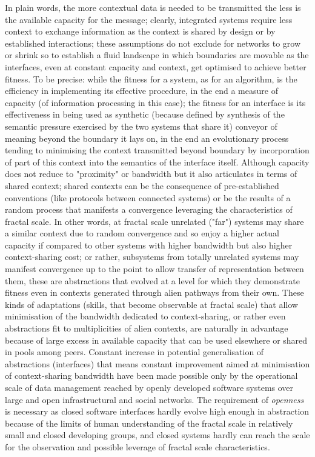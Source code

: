 \documentclass[14pt]{extarticle}
\begin{document}
In plain words, the more contextual data is needed to be transmitted the less is the available capacity for the message; clearly, integrated systems require less context to exchange information as the context is shared by design or by established interactions; these assumptions do not exclude for networks to grow or shrink so to establish a fluid landscape in which boundaries are movable as the interfaces, even at constant capacity and context, get optimised to achieve better fitness. To be precise: while the fitness for a system, as for an algorithm, is the efficiency in implementing its effective procedure, in the end a measure of capacity (of information processing in this case); the fitness for an interface is its effectiveness in being used as synthetic (because defined by synthesis of the semantic pressure exercised by the two systems that share it) conveyor of meaning beyond the boundary it lays on, in the end an evolutionary process tending to minimising the context transmitted beyond boundary by incorporation of part of this context into the semantics of the interface itself.
\newline
Although capacity does not reduce to "proximity" or bandwidth but it also articulates in terms of shared context; shared contexts can be the consequence of pre-established conventions (like protocols between connected systems) or be the results of a random process that manifests a convergence leveraging the characteristics of fractal scale. In other words, at fractal scale unrelated ("far") systems may share a similar context due to random convergence and so enjoy a higher actual capacity if compared to other systems with higher bandwidth but also higher context-sharing cost; or rather, subsystems from totally unrelated systems may manifest convergence up to the point to allow transfer of representation between them, these are abstractions that evolved at a level for which they demonstrate fitness even in contexts generated through alien pathways from their own. These kinds of adaptations (skills, that become observable at fractal scale) that allow minimisation of the bandwidth dedicated to context-sharing, or rather even abstractions fit to multiplicities of alien contexts, are naturally in advantage because of large excess in available capacity that can be used elsewhere or shared in pools among peers. Constant increase in potential generalisation of abstractions (interfaces) that means constant improvement aimed at minimisation of context-sharing bandwidth have been made possible only by the operational scale of data management reached by openly developed software systems over large and open infrastructural and social networks. The requirement of \textit{openness} is necessary as closed software interfaces hardly evolve high enough in abstraction because of the limits of human understanding of the fractal scale in relatively small and closed developing groups, and closed systems hardly can reach the scale for the observation and possible leverage of fractal scale characteristics.  

\newpage

\end{document}
